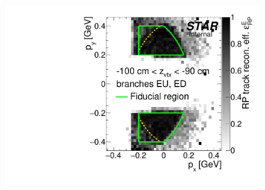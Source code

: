 \begin{figure}[hb]
{  \includegraphics[width=\linewidth,page=18]{graphics/corrections/mcEffPxPy.pdf}
}%
\end{figure}



